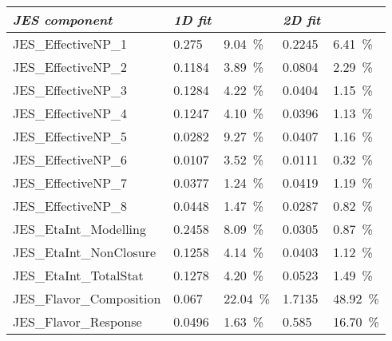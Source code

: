\begin{center}\
	\label{tab:errorx1}
	
	
	\vspace{0.3cm}	
	
\begin{tabular}{>{}m{5.0cm}>{}m{2.5cm}>{}m{2.0cm} >{}m{2.5cm}>{}m{1.0cm}} \toprule
		
\emph{JES component}&  \hspace{1.2cm} \emph{1D fit}&&{\centering  \hspace{1.2cm} \emph{2D fit}}\\
\midrule
		
		
JES_EffectiveNP_1 & 0.275 &  9.04~\% & 0.2245 &  6.41~\%\\


JES_EffectiveNP_2 & 0.1184 &  3.89~\% & 0.0804 &  2.29~\%\\


JES_EffectiveNP_3 & 0.1284 &  4.22~\% & 0.0404 &   1.15~\%\\


JES_EffectiveNP_4 & 0.1247 &  4.10~\% &  0.0396 &  1.13~\% \\


JES_EffectiveNP_5 & 0.0282 & 9.27~\% & 0.0407 &  1.16~\% \\


JES_EffectiveNP_6 & 0.0107 &  3.52~\% & 0.0111  &  0.32~\% \\


JES_EffectiveNP_7 & 0.0377 &  1.24~\% &0.0419 &  1.19~\%\\


JES_EffectiveNP_8 & 0.0448 &  1.47~\% & 0.0287 &  0.82~\% \\

JES_EtaInt_Modelling & 0.2458 &  8.09~\% & 0.0305 &  0.87~\% \\


JES_EtaInt_NonClosure & 0.1258 & 4.14~\% & 0.0403 &  1.12~\% \\

JES_EtaInt_TotalStat & 0.1278 &  4.20~\% & 0.0523 &  1.49~\% \\

JES_Flavor_Composition & 0.067 &  22.04~\% & 1.7135 & 48.92~\%  \\


JES_Flavor_Response & 0.0496 &  1.63~\% & 0.585 &  16.70~\% \\



\end{tabular}
\end{center}
